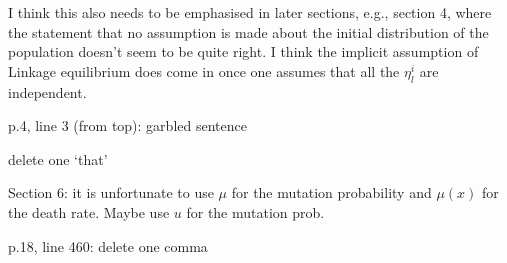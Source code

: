 \begin{point}{}
     I think this also needs to be emphasised in later sections,
     e.g., section 4, where the statement that no assumption is made about the initial distribution of the population
     doesn't seem to be quite right.
     I think the implicit assumption of Linkage equilibrium does come in
     once one assumes that all the $\eta_{l}^{i}$ are independent.
\end{point}




\begin{point}{\revref}
     p.4, line 3 (from top): garbled sentence
\end{point}


\begin{point}{\revref}
     delete one `that'
\end{point}


\begin{point}{}
     Section 6: it is unfortunate to use $\mu$ for the mutation probability and $\mu(x)$ for the death rate. Maybe use $u$ for the mutation prob.
\end{point}


\begin{point}{\revref}
     p.18, line 460: delete one comma
\end{point}

